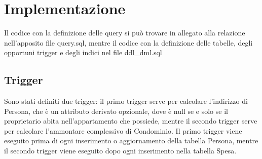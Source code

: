 \section{Implementazione}
\label{impl}

Il codice con la definizione delle query si può trovare in allegato alla relazione nell'apposito file query.sql, mentre il codice con la definizione delle tabelle, degli opportuni trigger e degli indici nel file ddl\_dml.sql

\subsection{Trigger}

    Sono stati definiti due trigger: il primo trigger serve per calcolare l'indirizzo di Persona, che è un attributo derivato opzionale, dove è null se e solo se il proprietario abita nell'appartamento che possiede, mentre il secondo trigger serve per calcolare l'ammontare complessivo di Condominio.
    Il primo trigger viene eseguito prima di ogni inserimento o aggiornamento della tabella Persona, mentre il secondo trigger viene eseguito dopo ogni inserimento nella tabella Spesa.
